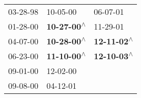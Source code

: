 \begin{supertabular}{lll}
 03-28-98\textsuperscript{} &                   10-05-00\textsuperscript{} &                   06-07-01\textsuperscript{} \\
 01-28-00\textsuperscript{} &  \textbf{10-27-00\textsuperscript{$\wedge$}} &                   11-29-01\textsuperscript{} \\
 04-07-00\textsuperscript{} &  \textbf{10-28-00\textsuperscript{$\wedge$}} &  \textbf{12-11-02\textsuperscript{$\wedge$}} \\
 06-23-00\textsuperscript{} &  \textbf{11-10-00\textsuperscript{$\wedge$}} &  \textbf{12-10-03\textsuperscript{$\wedge$}} \\
 09-01-00\textsuperscript{} &                   12-02-00\textsuperscript{} &                                              \\
 09-08-00\textsuperscript{} &                   04-12-01\textsuperscript{} &                                              \\
\end{supertabular}
